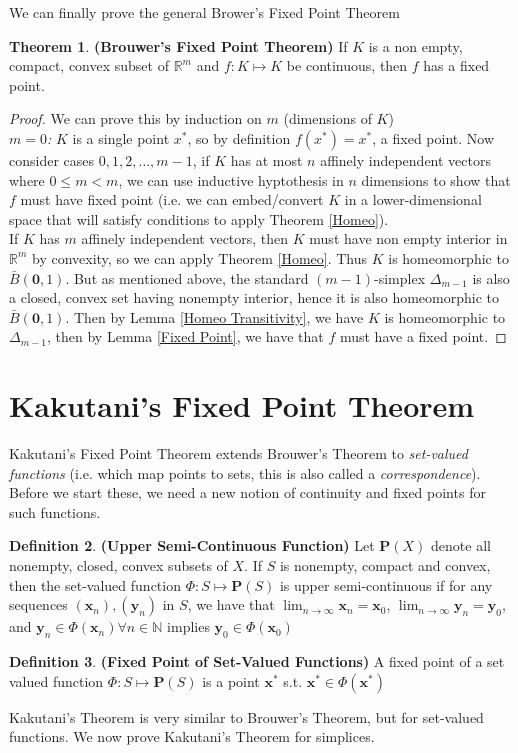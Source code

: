 \documentclass{article}
\theoremstyle{definition}
\newtheorem{theorem}{Theorem}[section]
\newtheorem{defn}[theorem]{Definition}
\begin{document}
We can finally prove the general Brower's Fixed Point Theorem
\begin{theorem}
\label{Gen Brouwer's}
\textbf{(Brouwer's Fixed Point Theorem)} If $K$ is a non empty, compact, convex subset of $\mathbb{R}^m$ and $f:K\mapsto K$ be continuous, then $f$ has a fixed point.
\end{theorem}
\begin{proof}
We can prove this by induction on $m$ (dimensions of $K$)\\
\textit{$m = 0$:} $K$ is a single point $x^*$, so by definition $f(x^*) = x^*$, a fixed point. Now consider cases $0,1,2,\dots, m-1$, if $K$ has at most $n$ affinely independent vectors where $0\leq m<m$, we can use inductive hyptothesis in $n$ dimensions to show that $f$ must have fixed point (i.e. we can embed/convert $K$ in a lower-dimensional space that will satisfy conditions to apply Theorem \ref{Homeo}).\\

If $K$ has $m$ affinely independent vectors, then $K$ must have non empty interior in $\mathbb{R}^m$ by convexity, so we can apply Theorem \ref{Homeo}. Thus $K$ is homeomorphic to $\bar{B}(\mathbf{0},1)$. But as mentioned above, the standard $(m-1)$-simplex $\Delta_{m-1}$ is also a closed, convex set having nonempty interior, hence it is also homeomorphic to $\bar{B}(\mathbf{0},1)$. Then by Lemma \ref{Homeo Transitivity}, we have $K$ is homeomorphic to $\Delta_{m-1}$, then by Lemma \ref{Fixed Point}, we have that $f$ must have a fixed point.
\end{proof}
\section{Kakutani's Fixed Point Theorem}
Kakutani's Fixed Point Theorem extends Brouwer's Theorem to \textit{set-valued functions} (i.e. which map points to sets, this is also called a \textit{correspondence}). Before we start these, we need a new notion of continuity and fixed points for such functions.

\begin{defn}
\textbf{(Upper Semi-Continuous Function)} Let $\mathbf{P}(X)$ denote all nonempty, closed, convex subsets of $X$. If $S$ is nonempty, compact and convex, then the set-valued function $\Phi:S\mapsto \mathbf{P}(S)$ is upper semi-continuous if for any sequences $(\mathbf{x}_n),(\mathbf{y}_n)$ in $S$, we have that $\lim_{n\to\infty} \mathbf{x}_n = \mathbf{x}_0$, $\lim_{n\to\infty} \mathbf{y}_n = \mathbf{y}_0$, and $\mathbf{y}_n\in \Phi(\mathbf{x}_n)\forall n\in \mathbb{N}$ implies $\mathbf{y}_0 \in \Phi(\mathbf{x}_0)$
\end{defn}
\begin{defn}
\textbf{(Fixed Point of Set-Valued Functions)} A fixed point of a set valued function $\Phi: S\mapsto \mathbf{P}(S)$ is a point $\mathbf{x}^*$ s.t. $\mathbf{x}^*\in \Phi(\mathbf{x}^*)$
\end{defn}
Kakutani’s Theorem is very similar to Brouwer’s Theorem, but for set-valued functions. We now prove Kakutani's Theorem for simplices.
\end{document}
